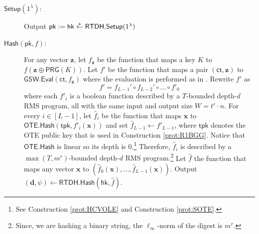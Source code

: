 \documentclass{article}
\newcommand{\getsr}{\overset{\raisebox{-1pt}{$\scriptscriptstyle \$$}}{\gets}}
\newcommand{\sample}{\getsr}
\newcommand{\OTE}{\mathsf{OTE}}
\renewcommand{\sec}{\ensuremath{\lambda}}
\newcommand{\secpar}{\sec}
\newcommand{\ct}{\mathsf{ct}}
\newcommand{\RTDH}{\mathsf{RTDH}}
\newcommand{\BV}{\mathsf{GSW}}
\newcommand{\algofont}[1]{\ensuremath{\mathsf{#1}}}
\newcommand{\tpk}{{\algofont{tpk}}}
\newcommand{\Setup}{{\algofont{Setup}}}
\newcommand{\Eval}{\algofont{Eval}\xspace}
\newcommand{\Hash}{{\algofont{Hash}}}
\newcommand{\pk}{{\mathsf{pk}}}
\newcommand{\hk}{\ensuremath{\mathsf{hk}}}
\newcommand\bbbone{1}
\newenvironment{protocol}[1][]
{\begin{algorithm}\caption{#1}}
  {\end{algorithm}}
\begin{document}
\begin{protocol}[Rate-1 Adaptive LFE for Bounded-Depth Circuits (to be continued)]%
\label{prot:R1LFEforP}


\begin{description}
\item[$\Setup(1^\secpar)$:] Output $\pk:=\hk\sample\RTDH.\Setup(\bbbone^\sec)$


\item[$\Hash(\pk, f)$:] For any vector $\mathbf{z}$, let $f_{\mathbf{z}}$ be the function that maps a key $K$ to $f(\mathbf{z}\oplus \mathsf{PRG}(K))$. Let $f'$ be the function that maps a pair $(\ct, \mathbf{z})$ to $\BV.\Eval(\ct, f_{\mathbf{z}})$ where the evaluation is performed as in \cite{ITCS:BraVai14}. 
Rewrite $f'$ as \[f'=f_{L-1}'\circ f_{L-2}'\circ\dots\circ f'_0\] where each $f'_i$ is a boolean function described by a $T$-bounded depth-$d$ RMS program, all with the same input and output size $W=t^r\cdot n$.
For every $i\in[L-1]$, let $\hat{f}_i$ be the function that maps $\mathbf{x}$ to $\OTE.\Hash(\tpk, f'_i(\mathbf{x}))$ and set $\hat{f}_{L-1}\gets f'_{L-1}$, where $\tpk$ denotes the OTE public key that is used in Construction \ref{prot:R1BGG}. Notice that $\OTE.\Hash$ is linear so its depth is $0$.\footnote{See Construction \ref{prot:HCVOLE} and Construction \ref{prot:SOTE}.} {Therefore, $\hat{f}_i$ is described by a $\max(T, m^{r})$-bounded depth-$d$ RMS program.\footnote{Since, we are hashing a binary string, the $\ell_\infty$-norm of the digest is $m^r$.}} Let $\hat{f}$ the function that maps any vector $\mathbf{x}$ to $(\hat{f}_0(\mathbf{x}), \dots, \hat{f}_{L-1}(\mathbf{x}))$. Output $(\mathbf{d}, \psi)\gets\RTDH.\Hash(\hk, \hat{f})$.




\end{description}
\end{protocol}
\end{document}
